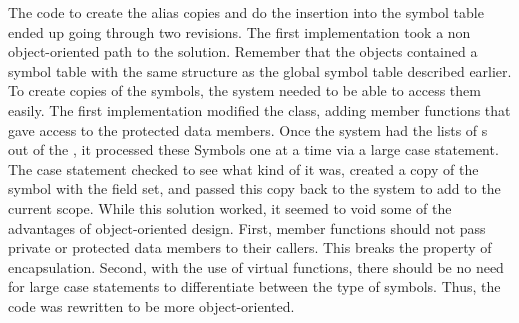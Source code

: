 The code to create the alias copies and do the insertion into the
symbol table ended up going through two revisions. The first
implementation took a non object-oriented path to the
solution. Remember that the  objects contained a
symbol table with the same structure as the global symbol table
described earlier. To create copies of the symbols, the system needed
to be able to access them easily. The first implementation modified
the
 class, adding member functions that gave access to
the protected data members. Once the system had the lists of
s out of the , it processed these
Symbols one at a time via a large case statement. The case statement
checked to see what kind of  it was, created a copy
of the symbol with the  field set, and passed this
copy back to the system to add to the current scope. While this
solution worked, it seemed to void some of the advantages of
object-oriented design. First, member functions should not pass
private or protected data members to their callers. This breaks the
property of encapsulation. Second, with the use of virtual functions,
there should be no need for large case statements to differentiate
between the type of symbols. Thus, the code was rewritten to be more
object-oriented.

